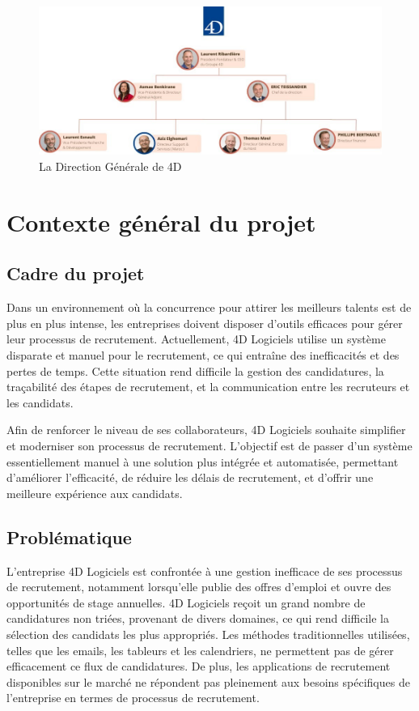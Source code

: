 \begin{figure}[h]
    \centering
    \includegraphics[scale=0.6]{Images/direction.jpg} %
    \caption{La Direction Générale de 4D}
    \label{fig:direction}
\end{figure}


\section{Contexte général du projet}
\subsection{Cadre du projet}
Dans un environnement où la concurrence pour attirer les meilleurs talents
 est de plus en plus intense, les entreprises doivent disposer d'outils 
 efficaces pour gérer leur processus de recrutement. Actuellement, 
 4D Logiciels utilise un système disparate et manuel pour le recrutement, 
 ce qui entraîne des inefficacités et des pertes de temps. Cette situation 
 rend difficile la gestion des candidatures, la traçabilité des étapes de 
 recrutement, et la communication entre les recruteurs et les candidats.

Afin de renforcer le niveau de ses collaborateurs, 4D Logiciels souhaite 
simplifier et moderniser son processus de recrutement. L'objectif est de passer 
d'un système essentiellement manuel à une solution plus intégrée et automatisée, 
permettant d'améliorer l'efficacité, de réduire les délais de recrutement, 
et d'offrir une meilleure expérience aux candidats.

\subsection{Problématique}
L'entreprise 4D Logiciels est confrontée à une gestion inefficace
 de ses processus de recrutement, notamment lorsqu'elle publie 
 des offres d'emploi et ouvre des opportunités de stage annuelles.
4D Logiciels reçoit un grand nombre de candidatures non triées,
provenant de divers domaines, ce qui rend difficile la
sélection des candidats les plus appropriés. Les méthodes 
traditionnelles utilisées, telles que les emails, les tableurs 
et les calendriers, ne permettent pas de gérer efficacement 
ce flux de candidatures. De plus, les applications de recrutement
 disponibles sur le marché ne répondent pas pleinement aux 
 besoins spécifiques de l'entreprise en termes de processus 
 de recrutement.

